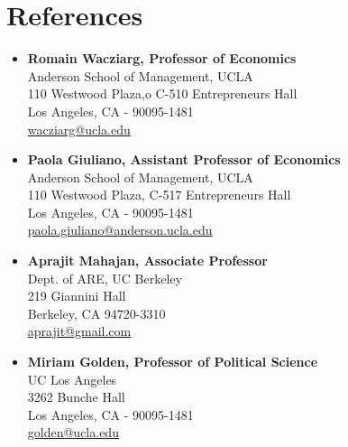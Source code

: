 \documentclass[11pt]{article}
\begin{document}
\section{References}
\label{sec-8}
\vspace{-0.2in}
\begin{multicols}{2}
\begin{itemize}
\item \textbf{Romain Wacziarg, Professor of Economics} \\
  Anderson School of Management, UCLA \\
  110 Westwood Plaza,o C-510 Entrepreneurs Hall\\
  Los Angeles, CA - 90095-1481\\
  \href{mailto:wacziarg@ucla.edu}{wacziarg@ucla.edu}\\
\item \textbf{Paola Giuliano, Assistant Professor of Economics} \\
  Anderson School of Management, UCLA \\
  110 Westwood Plaza, C-517 Entrepreneurs Hall\\
  Los Angeles, CA - 90095-1481\\
  \href{mailto:paola.giuliano@anderson.ucla.edu}{paola.giuliano@anderson.ucla.edu}\\
\item \textbf{Aprajit Mahajan, Associate Professor} \\
  Dept. of ARE, UC Berkeley \\
  219 Giannini Hall\\
  Berkeley, CA 94720-3310\\
  \href{mailto:aprajit@gmail.com}{aprajit@gmail.com}\\
\item \textbf{Miriam Golden, Professor of Political Science}\\
  UC Los Angeles \\
  3262 Bunche Hall\\
  Los Angeles, CA - 90095-1481\\
  \href{mailto:golden@ucla.edu}{golden@ucla.edu}
\end{itemize}
\end{multicols}
\end{document}
